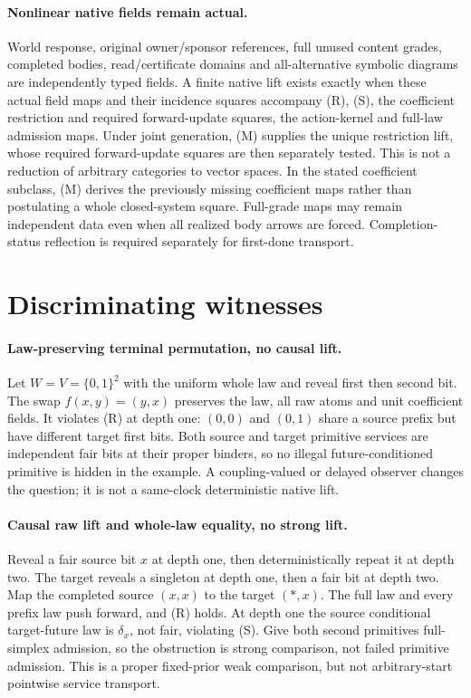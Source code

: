 \documentclass{article}
\begin{document}
\paragraph{Nonlinear native fields remain actual.}
World response, original owner/sponsor references, full unused content grades, completed bodies, read/certificate domains and all-alternative symbolic diagrams are independently typed fields. A finite native lift exists exactly when these actual field maps and their incidence squares accompany (R), (S), the coefficient restriction and required forward-update squares, the action-kernel and full-law admission maps. Under joint generation, (M) supplies the unique restriction lift, whose required forward-update squares are then separately tested. This is not a reduction of arbitrary categories to vector spaces. In the stated coefficient subclass, (M) derives the previously missing coefficient maps rather than postulating a whole closed-system square. Full-grade maps may remain independent data even when all realized body arrows are forced. Completion-status reflection is required separately for first-done transport.

\section{Discriminating witnesses}
\paragraph{Law-preserving terminal permutation, no causal lift.}
Let $W=V=\{0,1\}^2$ with the uniform whole law and reveal first then second bit. The swap $f(x,y)=(y,x)$ preserves the law, all raw atoms and unit coefficient fields. It violates (R) at depth one: $(0,0)$ and $(0,1)$ share a source prefix but have different target first bits. Both source and target primitive services are independent fair bits at their proper binders, so no illegal future-conditioned primitive is hidden in the example. A coupling-valued or delayed observer changes the question; it is not a same-clock deterministic native lift.

\paragraph{Causal raw lift and whole-law equality, no strong lift.}
Reveal a fair source bit $x$ at depth one, then deterministically repeat it at depth two. The target reveals a singleton at depth one, then a fair bit at depth two. Map the completed source $(x,x)$ to the target $(\ast,x)$. The full law and every prefix law push forward, and (R) holds. At depth one the source conditional target-future law is $\delta_x$, not fair, violating (S). Give both second primitives full-simplex admission, so the obstruction is strong comparison, not failed primitive admission. This is a proper fixed-prior weak comparison, but not arbitrary-start pointwise service transport.
\end{document}

